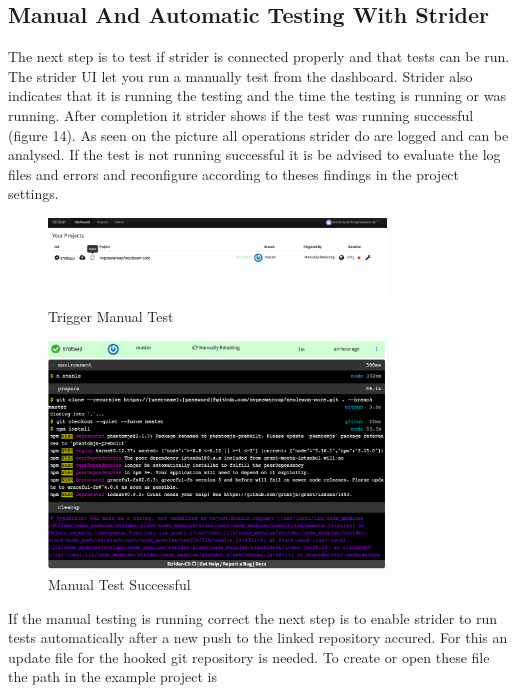 \subsection{Manual And Automatic Testing With Strider}
\label{Manual And Automatic Testing With Strider}
The next step is to test if strider is connected properly and that tests can be run. The strider UI let you run a manually test from
the dashboard. Strider also indicates that it is running the testing and the time the testing is running or was running. After completion
it strider shows if the test was running successful (figure 14). As seen on the picture all operations strider do are logged and can be
analysed. If the test is not running successful it is be advised to evaluate the log files and errors and reconfigure according to theses
findings in the project settings.

\begin{figure}[h!]
  \centering
  \includegraphics[width=0.8\textwidth]{images/manualTest.png}
  \caption{Trigger Manual Test}
\end{figure}

\begin{figure}[h!]
  \centering
  \includegraphics[width=0.8\textwidth]{images/successfulManualTest.png}
  \caption{Manual Test Successful}
\end{figure}

\newpage

If the manual testing is running correct the next step is to enable strider to run tests automatically after a new push to the
linked repository accured. For this an update file for the hooked git repository is needed. To create or open these file the path in
the example project is

